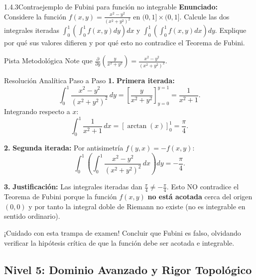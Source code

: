 \documentclass[11pt,a4paper]{article}
\begin{document}
\begin{nivelbox}{1.4.3}{Contraejemplo de Fubini para función no integrable}
\textbf{Enunciado:}\\
Considere la función $f(x,y) = \frac{x^2 - y^2}{(x^2 + y^2)^2}$ en $(0,1] \times (0,1]$. Calcule las dos integrales iteradas $\int_0^1 \left(\int_0^1 f(x,y) dy\right) dx$ y $\int_0^1 \left(\int_0^1 f(x,y) dx\right) dy$. Explique por qué sus valores difieren y por qué esto no contradice el Teorema de Fubini.

\begin{observacionbox}{Pista Metodológica}
Note que $\frac{\partial}{\partial y}\left(\frac{y}{x^2+y^2}\right) = \frac{x^2-y^2}{(x^2+y^2)^2}$.
\end{observacionbox}

\begin{ejerciciobox}{Resolución Analítica Paso a Paso}
\smallskip\noindent\textbf{1.} \textbf{Primera iterada:}
\[\int_0^1 \frac{x^2 - y^2}{(x^2 + y^2)^2} \, dy = \left[ \frac{y}{x^2 + y^2} \right]_{y=0}^{y=1} = \frac{1}{x^2 + 1}.\]
Integrando respecto a $x$:
\[\int_0^1 \frac{1}{x^2 + 1} \, dx = [\arctan(x)]_0^1 = \frac{\pi}{4}.\]

\smallskip\noindent\textbf{2.} \textbf{Segunda iterada:}
Por antisimetría $f(y,x) = -f(x,y)$:
\[\int_0^1 \left( \int_0^1 \frac{x^2 - y^2}{(x^2 + y^2)^2} \, dx \right) dy = -\frac{\pi}{4}.\]

\smallskip\noindent\textbf{3.} \textbf{Justificación:}
Las integrales iteradas dan $\frac{\pi}{4} \neq -\frac{\pi}{4}$. Esto NO contradice el Teorema de Fubini porque la función $f(x,y)$ \textbf{no está acotada} cerca del origen $(0,0)$ y por tanto la integral doble de Riemann no existe (no es integrable en sentido ordinario).
\end{ejerciciobox}

\begin{errorbox}{¡Cuidado con esta trampa de examen!}
Concluir que Fubini es falso, olvidando verificar la hipótesis crítica de que la función debe ser acotada e integrable.
\end{errorbox}
\end{nivelbox}
\bigskip

\subsection{Nivel 5: Dominio Avanzado y Rigor Topológico}
\end{document}
